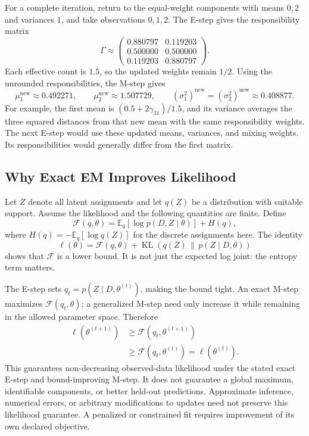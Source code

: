 For a complete iteration, return to the equal-weight components with means $0,2$ and variances $1$, and take observations $0,1,2$. The E-step gives the responsibility matrix
\[
\Gamma\approx
\begin{pmatrix}
0.880797&0.119203\\
0.500000&0.500000\\
0.119203&0.880797
\end{pmatrix}.
\]
Each effective count is $1.5$, so the updated weights remain $1/2$. Using the unrounded responsibilities, the M-step gives
\[
\mu_1^{\mathrm{new}}\approx0.492271,\qquad
\mu_2^{\mathrm{new}}\approx1.507729,\qquad
(\sigma_1^2)^{\mathrm{new}}=(\sigma_2^2)^{\mathrm{new}}\approx0.408877.
\]
For example, the first mean is $(0.5+2\gamma_{31})/1.5$, and its variance averages the three squared distances from that new mean with the same responsibility weights. The next E-step would use these updated means, variances, and mixing weights. Its responsibilities would generally differ from the first matrix.

\subsection{Why Exact EM Improves Likelihood}

Let $Z$ denote all latent assignments and let $q(Z)$ be a distribution with suitable support. Assume the likelihood and the following quantities are finite. Define
\[
\mathcal F(q,\theta)
=\mathbb E_q[\log p(D,Z\mid\theta)]+H(q),
\]
where $H(q)=-\mathbb E_q[\log q(Z)]$ for the discrete assignments here. The identity
\[
\ell(\theta)=\mathcal F(q,\theta)
+\operatorname{KL}\!\left(q(Z)\,\|\,p(Z\mid D,\theta)\right)
\]
shows that $\mathcal F$ is a lower bound. It is not just the expected log joint: the entropy term matters.

The E-step sets $q_t=p(Z\mid D,\theta^{(t)})$, making the bound tight. An exact M-step maximizes $\mathcal F(q_t,\theta)$; a generalized M-step need only increase it while remaining in the allowed parameter space. Therefore
\begin{align*}
\ell(\theta^{(t+1)})&\ge\mathcal F(q_t,\theta^{(t+1)})\\
&\ge\mathcal F(q_t,\theta^{(t)})
=\ell(\theta^{(t)}).
\end{align*}
This guarantees non-decreasing observed-data likelihood under the stated exact E-step and bound-improving M-step. It does not guarantee a global maximum, identifiable components, or better held-out predictions. Approximate inference, numerical errors, or arbitrary modifications to updates need not preserve this likelihood guarantee. A penalized or constrained fit requires improvement of its own declared objective.

